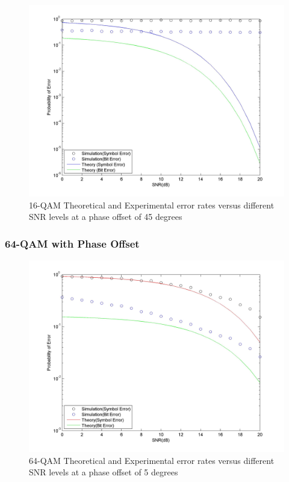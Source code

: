\documentclass[]{article}
\begin{document}
\begin{figure}[H]
\centering
\hspace*{-2cm}\includegraphics[width=1.3\textwidth]{qam16SNRpo4.jpg}
\caption{16-QAM Theoretical and Experimental error rates versus different SNR levels at a phase offset of 45 degrees }
\end{figure}

\subsubsection{64-QAM with Phase Offset}
\label{qam64_phase}
\begin{figure}[H]
\centering
\hspace*{-2cm}\includegraphics[width=1.3\textwidth]{qam64SNRpo1.jpg}
\caption{64-QAM Theoretical and Experimental error rates versus different SNR levels at a phase offset of 5 degrees }
\end{figure}
\end{document}
